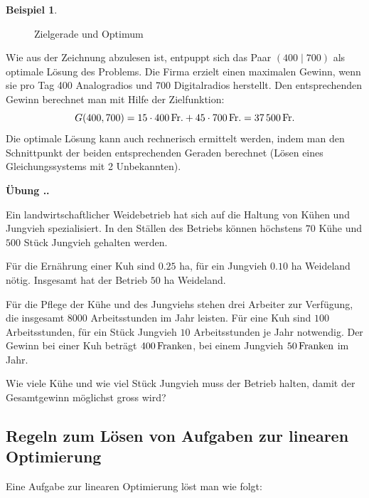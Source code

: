 \documentclass[%
11pt,%
twoside,%
titlepage,%
swissgerman,%
headsepline%
]{scrartcl}
\newcommand{\faEyeLightGray}{\textcolor{lightgray}{\faEye}} %
\theoremstyle{definition}
\newtheorem{bsp}{Beispiel}[subsection] %
\theoremstyle{plain}
\newcommand{\concatueb}[1]{ueb:#1}%
\newcommand{\concatlsg}[1]{lsg:#1}%
\newcounter{uebcounter}[section]
\renewcommand{\theuebcounter}{\thesection.\arabic{uebcounter}}  %
\newenvironment{uebenv}[1]{%
	\refstepcounter{uebcounter}
	\par\noindent\textbf{Übung \theuebcounter.}%
	\label{\concatueb{#1}}\hfill\hyperref[\concatlsg{#1}]{\faEyeLightGray}\par
}{%
	\par
}
\begin{document}
\begin{bsp}
\begin{figure}[h!]
\begin{center}
{
					}
				\end{center}
				\caption{Zielgerade und Optimum}
			\end{figure}
			Wie aus der Zeichnung abzulesen ist, entpuppt sich das Paar $(400\mid 700)$ als optimale Lösung des Problems. Die Firma erzielt einen maximalen Gewinn, wenn sie pro Tag 400 Analogradios und 700 Digitalradios herstellt. Den entsprechenden Gewinn berechnet man mit Hilfe der Zielfunktion:
			$$G(400,700) = \unit[15\cdot400]{Fr.} + \unit[45\cdot700]{Fr.} = \unit[37\,500]{Fr.}$$
			Die optimale Lösung kann auch rechnerisch ermittelt werden, indem man den Schnittpunkt der beiden entsprechenden Geraden berechnet (Lösen eines Gleichungssystems mit 2 Unbekannten).
		\end{bsp}
		
		\begin{uebenv}{weidebetrieb}
			Ein landwirtschaftlicher Weidebetrieb hat sich auf die Haltung von
			Kühen und Jungvieh spezialisiert. In den Ställen des Betriebs
			können höchstens $70$ Kühe und $500$ Stück Jungvieh gehalten
			werden.
			
			Für die Ernährung einer Kuh sind $0.25$ ha, für ein
			Jungvieh $0.10$ ha Weideland nötig. Insgesamt hat der Betrieb $50$
			ha Weideland.
			
			Für die Pflege der Kühe und des Jungviehs stehen drei
			Arbeiter zur Verfügung, die insgesamt $8000$ Arbeitsstunden im
			Jahr leisten. Für eine Kuh sind $100$ Arbeitsstunden, für ein
			Stück Jungvieh $10$ Arbeitsstunden je Jahr notwendig. Der Gewinn
			bei einer Kuh beträgt $\unit[400]{Franken}$, bei einem Jungvieh $\unit[50]{Franken}$ im
			Jahr.
			
			Wie viele Kühe und wie viel Stück Jungvieh muss der
			Betrieb halten, damit der Gesamtgewinn möglichst gross wird?
		\end{uebenv}
		
		\subsection{Regeln zum Lösen von Aufgaben zur linearen Optimierung}
		Eine Aufgabe zur linearen Optimierung löst man wie folgt:
		
\end{document}
